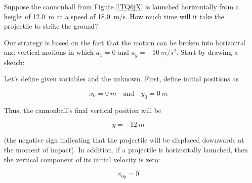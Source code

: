 \documentclass[main-physics.tex]{subfiles}
\begin{document}
\clearpage


\begin{example} \label{ER19WG}
    Suppose the cannonball from Figure \ref{lTQ6jX} is launched horizontally from a height of \SI{12.0}{m} at a speed of \SI{18.0}{m/s}. How much time will it take the projectile to strike the ground?
\end{example}

\Solution Our strategy is based on the fact that the motion can be broken into horizontal and vertical motions in which $a_x = 0$ and $a_y = \SI{-10}{m/s^2}$. Start by drawing a sketch:

\begin{center}
\end{center}


Let's define given variables and the unknown. First, define initial positions as 

\begin{equation*}
    x_0 = \SI{0}{m} \quad \text{and} \quad y_0 = \SI{0}{m}
\end{equation*}

Thus, the cannonball's final vertical position will be

\begin{equation*}
    y = -\SI{12}{m}
\end{equation*}

(the negative sign indicating that the projectile will be displaced downwards at the moment of impact). In addition, if a projectile is horizontally launched, then the vertical component of its initial velocity is zero:

\begin{equation*}
    v_{0y} = 0
\end{equation*}
\end{document}

